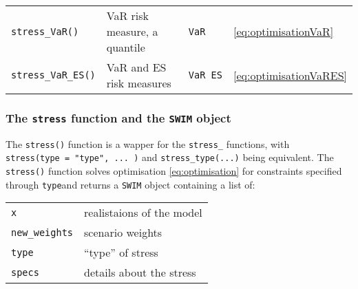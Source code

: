 \documentclass[]{article}
\begin{document}
\begin{longtable}[]{@{}llll@{}}
\begin{minipage}[t]{0.20\columnwidth}\raggedright
\texttt{stress\_VaR()}\strut
\end{minipage} & \begin{minipage}[t]{0.39\columnwidth}\raggedright
VaR risk measure, a quantile\strut
\end{minipage} & \begin{minipage}[t]{0.09\columnwidth}\raggedright
\texttt{VaR}\strut
\end{minipage} & \begin{minipage}[t]{0.20\columnwidth}\raggedright
\eqref{eq:optimisationVaR}\strut
\end{minipage}\tabularnewline
\begin{minipage}[t]{0.20\columnwidth}\raggedright
\texttt{stress\_VaR\_ES()}\strut
\end{minipage} & \begin{minipage}[t]{0.39\columnwidth}\raggedright
VaR and ES risk measures\strut
\end{minipage} & \begin{minipage}[t]{0.09\columnwidth}\raggedright
\texttt{VaR\ ES}\strut
\end{minipage} & \begin{minipage}[t]{0.20\columnwidth}\raggedright
\eqref{eq:optimisationVaRES}\strut
\end{minipage}\tabularnewline
\bottomrule
\end{longtable}

\hypertarget{Rstress}{%
\subsubsection{\texorpdfstring{The \texttt{stress} function and the \texttt{SWIM} object}{The stress function and the SWIM object}}\label{Rstress}}

The \texttt{stress()} function is a wapper for the \texttt{stress\_} functions, with \texttt{stress(type\ =\ "type",\ ...\ )} and \texttt{stress\_type(...)} being equivalent. The \texttt{stress()} function solves optimisation \eqref{eq:optimisation} for constraints specified through \texttt{type}and returns a \texttt{SWIM} object containing a list of:

\begin{longtable}[]{@{}ll@{}}
\toprule
\endhead
\texttt{x} & realistaions of the model\tabularnewline
\texttt{new\_weights} & scenario weights\tabularnewline
\texttt{type} & ``type'' of stress\tabularnewline
\texttt{specs} & details about the stress\tabularnewline
\bottomrule
\end{longtable}
\end{document}
